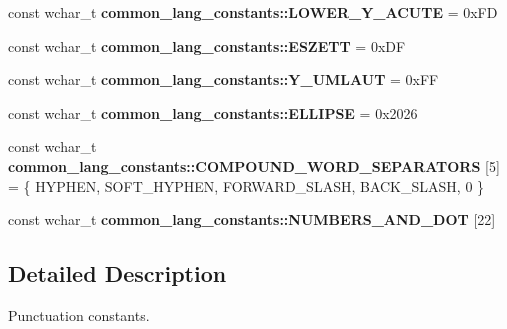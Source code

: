\begin{DoxyCompactItemize}
\item 
\hypertarget{group___indexing_ga53e1e8926e859e8223ddf8ebcb5580ae}{const wchar\-\_\-t {\bfseries common\-\_\-lang\-\_\-constants\-::\-L\-O\-W\-E\-R\-\_\-\-Y\-\_\-\-A\-C\-U\-T\-E} = 0x\-F\-D}\label{group___indexing_ga53e1e8926e859e8223ddf8ebcb5580ae}

\item 
\hypertarget{group___indexing_ga4b59e121ca1941919de08b198683e38c}{const wchar\-\_\-t {\bfseries common\-\_\-lang\-\_\-constants\-::\-E\-S\-Z\-E\-T\-T} = 0x\-D\-F}\label{group___indexing_ga4b59e121ca1941919de08b198683e38c}

\item 
\hypertarget{group___indexing_gab411a04ad2384e0ff28185ec9545c260}{const wchar\-\_\-t {\bfseries common\-\_\-lang\-\_\-constants\-::\-Y\-\_\-\-U\-M\-L\-A\-U\-T} = 0x\-F\-F}\label{group___indexing_gab411a04ad2384e0ff28185ec9545c260}

\item 
\hypertarget{group___indexing_ga98fc5a5b5dfbeb78c48a4af5b1b35d2c}{const wchar\-\_\-t {\bfseries common\-\_\-lang\-\_\-constants\-::\-E\-L\-L\-I\-P\-S\-E} = 0x2026}\label{group___indexing_ga98fc5a5b5dfbeb78c48a4af5b1b35d2c}

\item 
\hypertarget{group___indexing_ga8180bb8a67673f8c11678ce3e0a11cd2}{const wchar\-\_\-t {\bfseries common\-\_\-lang\-\_\-constants\-::\-C\-O\-M\-P\-O\-U\-N\-D\-\_\-\-W\-O\-R\-D\-\_\-\-S\-E\-P\-A\-R\-A\-T\-O\-R\-S} \mbox{[}5\mbox{]} = \{ H\-Y\-P\-H\-E\-N, S\-O\-F\-T\-\_\-\-H\-Y\-P\-H\-E\-N, F\-O\-R\-W\-A\-R\-D\-\_\-\-S\-L\-A\-S\-H, B\-A\-C\-K\-\_\-\-S\-L\-A\-S\-H, 0 \}}\label{group___indexing_ga8180bb8a67673f8c11678ce3e0a11cd2}

\item 
const wchar\-\_\-t {\bfseries common\-\_\-lang\-\_\-constants\-::\-N\-U\-M\-B\-E\-R\-S\-\_\-\-A\-N\-D\-\_\-\-D\-O\-T} \mbox{[}22\mbox{]}
\end{DoxyCompactItemize}


\subsection{Detailed Description}
Punctuation constants. 

